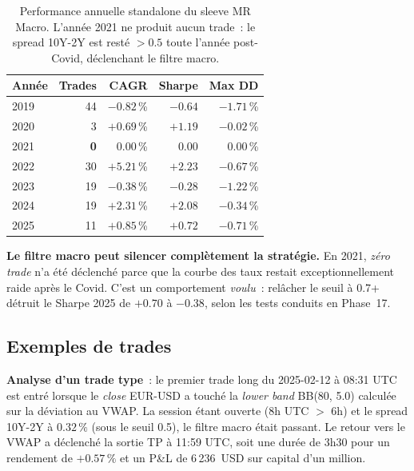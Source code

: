 \begin{table}[H]
\centering
\caption{Performance annuelle standalone du sleeve MR Macro. L'année 2021 ne produit aucun trade~: le spread 10Y-2Y est resté $>0.5$ toute l'année post-Covid, déclenchant le filtre macro.}
\renewcommand{\arraystretch}{1.1}
\begin{tabular}{lrrrr}
\toprule
\textbf{Année} & \textbf{Trades} & \textbf{CAGR} & \textbf{Sharpe} & \textbf{Max DD} \\
\midrule
2019 & 44 & $-0.82$\,\% & $-0.64$ & $-1.71$\,\% \\
2020 & 3 & $+0.69$\,\% & $+1.19$ & $-0.02$\,\% \\
2021 & \textbf{0} & $0.00$\,\% & $0.00$ & $0.00$\,\% \\
2022 & 30 & $+5.21$\,\% & \textbf{$+2.23$} & $-0.67$\,\% \\
2023 & 19 & $-0.38$\,\% & $-0.28$ & $-1.22$\,\% \\
2024 & 19 & $+2.31$\,\% & \textbf{$+2.08$} & $-0.34$\,\% \\
2025 & 11 & $+0.85$\,\% & $+0.72$ & $-0.71$\,\% \\
\bottomrule
\end{tabular}
\end{table}

\begin{warningbox}
\textbf{Le filtre macro peut silencer complètement la stratégie.} En 2021, \emph{zéro trade} n'a été déclenché parce que la courbe des taux restait exceptionnellement raide après le Covid. C'est un comportement \emph{voulu}~: relâcher le seuil à 0.7+ détruit le Sharpe 2025 de $+0.70$ à $-0.38$, selon les tests conduits en Phase~17.
\end{warningbox}

\subsection{Exemples de trades}



\begin{examplebox}
\textbf{Analyse d'un trade type}~: le premier trade long du 2025-02-12 à 08:31 UTC est entré lorsque le \emph{close} EUR-USD a touché la \emph{lower band} BB(80, 5.0) calculée sur la déviation au VWAP. La session étant ouverte (8h UTC $>$ 6h) et le spread 10Y-2Y à $0.32\,\%$ (sous le seuil 0.5), le filtre macro était passant. Le retour vers le VWAP a déclenché la sortie TP à 11:59 UTC, soit une durée de 3h30 pour un rendement de $+0.57\,\%$ et un P\&L de 6\,236~USD sur capital d'un million.
\end{examplebox}
